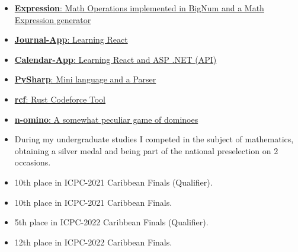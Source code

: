 \documentclass[9pt]{developercv} %
\begin{document}
\begin{minipage}[t]{0.45\textwidth}
	\vspace{-\baselineskip} %


	\begin{itemize}
		\item {\href{https://github.com/raudel25/Expression}{\textbf{Expression}: Math Operations implemented in BigNum and a Math Expression generator}}
		\item {\href{https://github.com/raudel25/Journal-App}{\textbf{Journal-App}: Learning React}}
		\item {\href{https://github.com/raudel25/Calendar-App}{\textbf{Calendar-App}: Learning React and ASP .NET (API)}}
		\item {\href{https://github.com/raudel25/PySharp}{\textbf{PySharp}: Mini language and a Parser}}
		\item {\href{https://github.com/raudel25/rcf}{\textbf{rcf}: Rust Codeforce Tool}}
		\item {\href{https://github.com/raudel25/n-omino}{\textbf{n-omino}: A somewhat peculiar game of dominoes}}
	\end{itemize}
\end{minipage}
\hfill
\begin{minipage}[t]{0.45\textwidth}
	\vspace{-\baselineskip} %


	\begin{itemize}
		\item During my undergraduate studies I competed in the subject of mathematics, obtaining a
		      silver medal and being part of the national preselection on 2 occasions.
		\item 10th place in ICPC-2021 Caribbean Finals (Qualifier).
		\item 10th place in ICPC-2021 Caribbean Finals.
		\item 5th place in ICPC-2022 Caribbean Finals (Qualifier).
		\item 12th place in ICPC-2022 Caribbean Finals.
	\end{itemize}

\end{minipage}



\end{document}
